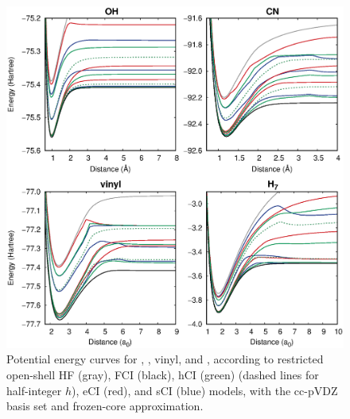\documentclass[aip,jcp,preprint,noshowkeys,superscriptaddress]{revtex4-1}
\begin{document}
\clearpage


\begin{figure}%
\includegraphics[width=1.0\linewidth]{plot_pes}
\caption{
Potential energy curves for , , vinyl, and ,
according to restricted open-shell HF (gray), FCI (black), hCI (green) (dashed lines for half-integer $h$), eCI (red), and sCI (blue) models, with the cc-pVDZ basis set and frozen-core approximation.}
\label{fig:plot_pes}
\end{figure}
\end{document}
